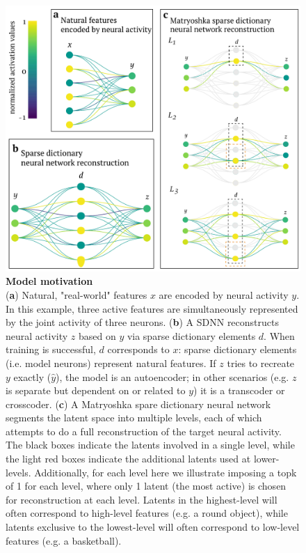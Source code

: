 \begin{figure}[htbp]
    \begin{minipage}{0.63\linewidth}
    \includegraphics[width=\linewidth]{figures/sdnn_arch.pdf}
    \end{minipage}%
    \begin{minipage}{0.37\linewidth}
    \caption{
        \textbf{Model motivation} \\
        \small
        (\textbf{a}) Natural, "real-world" features $x$ are encoded by neural activity $y$. In this example, three active features are simultaneously represented by the joint activity of three neurons. (\textbf{b}) A SDNN reconstructs neural activity $z$ based on $y$ via sparse dictionary elements $d$. When training is successful, $d$ corresponds to $x$: sparse dictionary elements (i.e. model neurons) represent natural features. If $z$ tries to recreate $y$ exactly ($\hat{y}$), the model is an autoencoder; in other scenarios (e.g. $z$ is separate but dependent on or related to $y$) it is a transcoder or crosscoder. (\textbf{c}) A Matryoshka spare dictionary neural network segments the latent space into multiple levels, each of which attempts to do a full reconstruction of the target neural activity. The black boxes indicate the latents involved in a single level, while the light red boxes indicate the additional latents used at lower-levels. Additionally, for each level here we illustrate imposing a topk of 1 for each level, where only 1 latent (the most active) is chosen for reconstruction at each level. Latents in the highest-level will often correspond to high-level features (e.g. a round object), while latents exclusive to the lowest-level will often correspond to low-level features (e.g. a basketball).
    }
    \label{fig:sdnn_arch}
    \end{minipage}
\end{figure}


